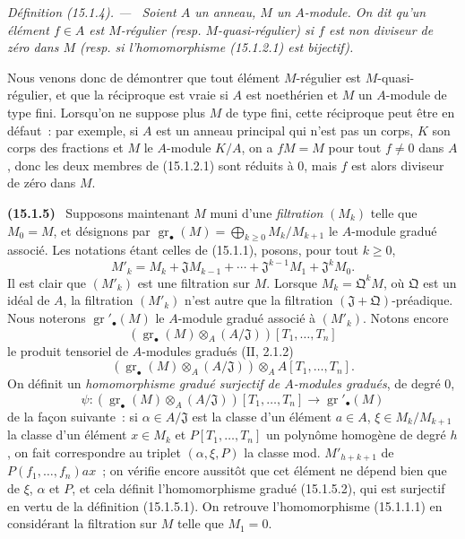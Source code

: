 \documentclass[10pt,oneside]{book}
\makeatletter
\newcommand{\gr}{\operatorname{gr}}
\newcommand{\setmanualcurrentlabel}[1]{\def\@currentlabel{#1}}
\newcommand{\oldpage}[2][]{%
  \setcounter{footnote}{0}%
  \marginpar{\scriptsize\textbf{#1}~|~#2}\ignorespaces}
\newenvironment{env}[1][]{\setmanualcurrentlabel{#1}\par\medskip\noindent\textbf{(#1)}\ }{\par}
\newenvironment{definition}[1][]{%
  \setmanualcurrentlabel{#1}\par\medskip\noindent\itshape Définition (#1). ---\ }{\par}
\makeatother
\begin{document}
\begin{definition}[15.1.4]
\label{0.15.1.4-fr}
Soient $A$ un anneau, $M$ un $A$-module. On dit qu'un élément $f\in A$ est
\emph{$M$-régulier} (resp. \emph{$M$-quasi-régulier}) si $f$ est non diviseur
de zéro dans $M$ (resp. si l'homomorphisme (15.1.2.1) est bijectif).
\end{definition}

Nous venons donc de démontrer que tout élément $M$-régulier est
$M$-quasi-régulier, et que la réciproque est vraie si $A$ est noethérien et
$M$ un $A$-module de type fini. Lorsqu'on ne suppose plus $M$ de type fini,
cette réciproque peut être en défaut~: par exemple, si $A$ est un anneau
principal qui n'est pas un corps, $K$ son corps des fractions et $M$ le
$A$-module $K/A$, on a $fM=M$ pour tout $f\neq0$ dans $A$, donc les deux
membres de (15.1.2.1) sont réduits à $0$, mais $f$ est alors diviseur de zéro
dans $M$.

\begin{env}[15.1.5]
\label{0.15.1.5-fr}
\oldpage[0\textsubscript{IV-1}]{14}
Supposons maintenant $M$ muni d'une \emph{filtration} $(M_k)$ telle que
$M_0=M$, et désignons par
$\gr_\bullet(M)=\bigoplus_{k\geq0}M_k/M_{k+1}$ le $A$-module gradué associé.
Les notations étant celles de (15.1.1), posons, pour tout $k\geq0$,
\[
  M'_k=M_k+\mathfrak{J}M_{k-1}+\cdots+
  \mathfrak{J}^{k-1}M_1+\mathfrak{J}^kM_0.
  \tag{15.1.5.1}\label{0.15.1.5.1-fr}
\]
Il est clair que $(M'_k)$ est une filtration sur $M$. Lorsque
$M_k=\mathfrak{Q}^kM$, où $\mathfrak Q$ est un idéal de $A$, la filtration
$(M'_k)$ n'est autre que la filtration
$(\mathfrak{J}+\mathfrak{Q})$-préadique. Nous noterons
$\gr'_\bullet(M)$ le $A$-module gradué associé à $(M'_k)$. Notons encore
\[
  (\gr_\bullet(M)\otimes_A(A/\mathfrak{J}))[T_1,\ldots,T_n]
\]
le produit tensoriel de $A$-modules gradués ($\mathrm{II}$, 2.1.2)
\[
  (\gr_\bullet(M)\otimes_A(A/\mathfrak{J}))
  \otimes_A A[T_1,\ldots,T_n].
\]
On définit un \emph{homomorphisme gradué surjectif de $A$-modules gradués}, de
degré $0$,
\[
  \psi:(\gr_\bullet(M)\otimes_A(A/\mathfrak{J}))[T_1,\ldots,T_n]
  \longrightarrow\gr'_\bullet(M)
  \tag{15.1.5.2}\label{0.15.1.5.2-fr}
\]
de la façon suivante~: si $\alpha\in A/\mathfrak{J}$ est la classe d'un
élément $a\in A$, $\xi\in M_k/M_{k+1}$ la classe d'un élément $x\in M_k$ et
$P[T_1,\ldots,T_n]$ un polynôme homogène de degré $h$, on fait correspondre au
triplet $(\alpha,\xi,P)$ la classe mod. $M'_{h+k+1}$ de
$P(f_1,\ldots,f_n)ax$~; on vérifie encore aussitôt que cet élément ne dépend
bien que de $\xi$, $\alpha$ et $P$, et cela définit l'homomorphisme gradué
(15.1.5.2), qui est surjectif en vertu de la définition (15.1.5.1). On
retrouve l'homomorphisme (15.1.1.1) en considérant la filtration sur $M$ telle
que $M_1=0$.
\end{env}
\end{document}
